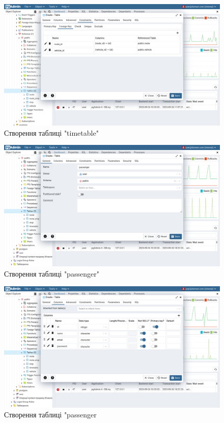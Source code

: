 \documentclass[14pt]{extreport}
\begin{document}
\begin{normalsize}
	\begin{figure}[H]
		\centering
		\includegraphics[scale=0.35]{32}
		\caption{Створення таблиці "timetable"}
	\end{figure}
	
	\begin{figure}[H]
		\centering
		\includegraphics[scale=0.35]{33}
		\caption{Створення таблиці "passenger"}
	\end{figure}
	
	\begin{figure}[H]
		\centering
		\includegraphics[scale=0.35]{34}
		\caption{Створення таблиці "passenger}
	\end{figure}
	

\end{normalsize}
\end{document}
